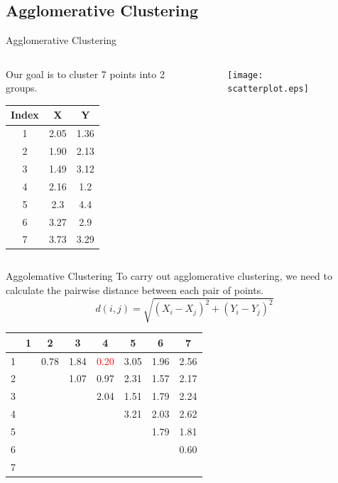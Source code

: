 \documentclass{beamer}
\begin{document}
	\subsection{Agglomerative Clustering}
	\begin{frame}
		\tableofcontents
		[
		currentsection,
		currentsubsection,
		subsectionstyle=show/shaded/hide
		]
	\end{frame}
	
	\begin{frame}{Agglomerative Clustering}
		\begin{columns}
			\begin{column}{0.4\linewidth}
				Our goal is to cluster 7 points into 2 groups.
				\begin{table}[htbp]
					\centering
					\begin{tabular}{ccc}
						\toprule
						Index & X & Y\\
						\midrule
						1 & 2.05 & 1.36\\
						2 & 1.90 & 2.13\\
						3 & 1.49 & 3.12\\
						4 & 2.16 & 1.2\\
						5 & 2.3 & 4.4\\
						6 & 3.27 & 2.9\\
						7 & 3.73 & 3.29\\
						\bottomrule
					\end{tabular}
				\end{table}
			\end{column}
			\begin{column}{0.6\linewidth}
				\begin{figure}[htbp]
					\centering
					\texttt{[image: scatterplot.eps]}
				\end{figure}
			\end{column}
		\end{columns}
	\end{frame}
	
	\begin{frame}{Aggolemative Clustering}
		To carry out agglomerative clustering, we need to calculate the pairwise distance between each pair of points.
		\[ d(i, j) = \sqrt{(X_i - X_j)^2 + (Y_i - Y_j)^2 }\]
		
		\begin{table}
			\centering
			\begin{tabular}{c|ccccccc}
				&1&2&3&4&5&6&7\\
				\hline
				1&&0.78&1.84&\textcolor{red}{0.20}&3.05&1.96&2.56\\
				2&&&1.07&0.97&2.31&1.57&2.17\\
				3&&&&2.04&1.51&1.79&2.24\\
				4&&&&&3.21&2.03&2.62\\
				5&&&&&&1.79&1.81\\
				6&&&&&&&0.60\\
				7&&&&&&&\\
			\end{tabular}
		\end{table}
	\end{frame}
	
\end{document}
